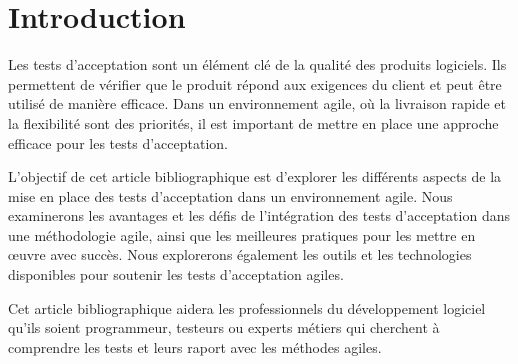 

\chapter{Introduction}

\label{chap:intro}

Les tests d'acceptation sont un élément clé de la qualité des produits logiciels. Ils permettent de vérifier que le produit répond aux exigences du client et peut être utilisé de manière efficace. Dans un environnement agile, où la livraison rapide et la flexibilité sont des priorités, il est important de mettre en place une approche efficace pour les tests d'acceptation.

L'objectif de cet article bibliographique est d'explorer les différents aspects de la mise en place des tests d'acceptation dans un environnement agile. Nous examinerons les avantages et les défis de l'intégration des tests d'acceptation dans une méthodologie agile, ainsi que les meilleures pratiques pour les mettre en œuvre avec succès. Nous explorerons également les outils et les technologies disponibles pour soutenir les tests d'acceptation agiles.

Cet article bibliographique aidera les professionnels du développement logiciel qu'ils soient programmeur, testeurs ou experts métiers qui cherchent à comprendre les tests et leurs raport avec les méthodes agiles.